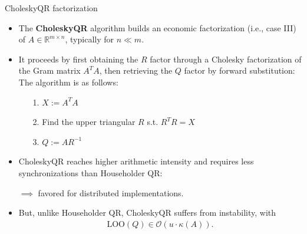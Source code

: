 \documentclass[t,usepdftitle=false]{beamer}
\begin{document}
\begin{frame}{CholeskyQR factorization}
\begin{itemize}
\item The \textbf{CholeskyQR} algorithm builds an economic factorization (i.e., case III) of $A\in\mathbb{R}^{m\times n}$, typically for $n\ll m$.
\item It proceeds by first obtaining the $R$ factor through a Cholesky factorization of the Gram matrix $A^TA$, then retrieving the $Q$ factor by forward substitution:\vspace{.1cm}\\
The algorithm is as follows:
\begin{itemize}
\item[1.]$X:=A^TA${\color{gray}{ // BLAS 3}}\vspace{.1cm}
\item[2.]Find the upper triangular $R$ s.t. $R^TR=X$
{\color{gray}{ // Cholesky factorization}}\vspace{.1cm}
\item[3.]$Q:=AR^{-1}${\color{gray}{ // triangular solves}}
\end{itemize}
\item CholeskyQR reaches higher arithmetic intensity and requires less synchronizations than Householder QR:\vspace{.1cm}\\
\begin{center}$\implies$ favored for distributed implementations.\end{center}
\item But, unlike Householder QR, CholeskyQR suffers from instability, with
\begin{align*}
\text{LOO}(Q)\in\mathcal{O}(u\cdot\kappa(A)).
\end{align*}
\end{itemize}
\end{frame}
\end{document}
